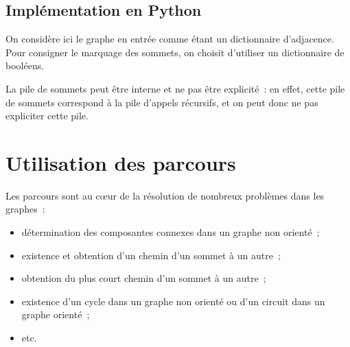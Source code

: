 \documentclass[11pt]{article}
\begin{document}
\FloatBarrier


\subsection{Implémentation en Python}

On considère ici le graphe en entrée comme étant un dictionnaire d'adjacence. Pour consigner le marquage des sommets, on choisit d'utiliser un dictionnaire de booléens.



La pile de sommets peut être interne et ne pas être explicité~: en effet, cette pile de sommets correspond à la pile d'appels récursifs, et on peut donc ne pas expliciter cette pile.







\section{Utilisation des parcours}

Les parcours sont au c\oe{}ur de la résolution de nombreux problèmes dans les graphes~: 
\begin{itemize}
	\item détermination des composantes connexes dans un graphe non orienté~; 
	\item existence et obtention d'un chemin d'un sommet à un autre~; 
	\item obtention du plus court chemin d'un sommet à un autre~;
	\item existence d'un cycle dans un graphe non orienté ou d'un circuit dans un  graphe orienté~;
	\item etc.
\end{itemize}
\end{document}
